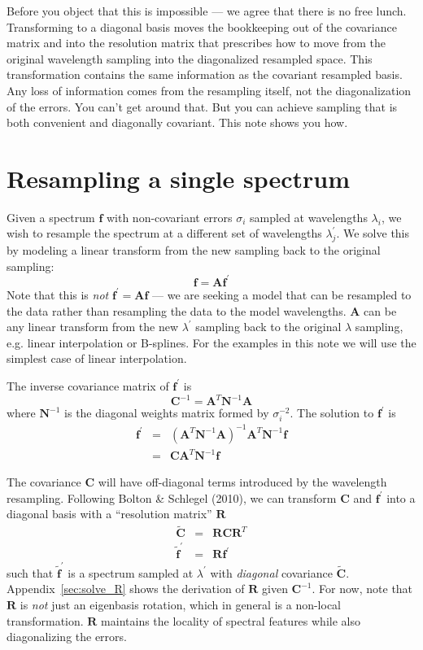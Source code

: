 \documentclass[12pt]{article}
\newcommand{\C}{\mathbf{C}}
\newcommand{\Ci}{\mathbf{C}^{-1}}
\newcommand{\R}{\mathbf{R}}
\newcommand{\A}{\mathbf{A}}
\newcommand{\N}{\mathbf{N}}
\newcommand{\f}{\mathbf{f}}
\begin{document}
Before you object that this is impossible --- we agree that there is no
free lunch.  Transforming to a diagonal basis moves the bookkeeping out
of the covariance matrix and into the resolution matrix that prescribes
how to move from the original wavelength sampling into the diagonalized
resampled space.  This transformation
contains the same information as the covariant resampled basis.
Any loss of information comes from the resampling itself,
not the diagonalization of the errors.
You can't get around that.  But you can achieve sampling that is both
convenient and diagonally covariant.  This note shows you how.

\section{Resampling a single spectrum}
\label{sec:single_spec}

Given a spectrum $\f$ with non-covariant errors $\sigma_i$ sampled at
wavelengths $\lambda_i$, we wish to resample the spectrum at a different
set of wavelengths $\lambda_j^\prime$.
We solve this by modeling a linear transform from the new
sampling back to the original sampling:
\begin{equation}
    \f = \A \f^\prime
\end{equation}
Note that this is {\em not} $\f^\prime = \A \f$ --- we are seeking a model
that can be resampled to the data rather than resampling the data to the
model wavelengths.
$\A$ can be any linear transform from the new $\lambda^\prime$ sampling
back to the original $\lambda$ sampling, e.g. linear interpolation or
B-splines.  For the examples in this note we will use the simplest case
of linear interpolation.

The inverse covariance matrix of $\f^\prime$ is
\begin{equation}
    \Ci = \A^T \N^{-1} \A
\end{equation}
where $\N^{-1}$ is the diagonal weights matrix formed by $\sigma_i^{-2}$.
The solution to $\f^\prime$ is
\begin{eqnarray}
    \f^\prime & = &  (\A^T \N^{-1} \A)^{-1} \A^T \N^{-1} \f \\
              & = & \C \A^T \N^{-1} \f    \label{eq:solve_fprime}
\end{eqnarray}

The covariance $\C$ will have off-diagonal terms introduced by the
wavelength resampling.
Following Bolton \& Schlegel (2010), we can transform $\C$ and
$\f^\prime$ into a diagonal basis with a ``resolution matrix'' $\R$
\begin{eqnarray}
    \tilde{\C} & = & \R \C \R^T \\
    \tilde{\f}^\prime & = & \R \f^\prime
\end{eqnarray}
such that $\tilde{\f}^\prime$ is a spectrum sampled at $\lambda^\prime$ with
{\em diagonal} covariance $\tilde{\C}$.
Appendix~\ref{sec:solve_R} shows the derivation of $\R$ given $\Ci$.
For now, note that $\R$ is \emph{not} just an eigenbasis rotation,
which in general is a non-local transformation.  $\R$ maintains the
locality of spectral features while also diagonalizing the errors.
\end{document}
